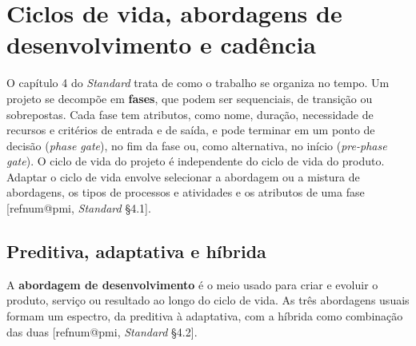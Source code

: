 \documentclass[11pt,a4paper]{article}
\makeatletter
\newcommand{\refnum}[1]{\csname refnum@#1\endcsname}
\makeatother
\begin{document}
\section{Ciclos de vida, abordagens de desenvolvimento e cadência}

O capítulo 4 do \textit{Standard} trata de como o trabalho se organiza no tempo. Um projeto se decompõe em \textbf{fases}, que podem ser sequenciais, de transição ou sobrepostas. Cada fase tem atributos, como nome, duração, necessidade de recursos e critérios de entrada e de saída, e pode terminar em um ponto de decisão (\textit{phase gate}), no fim da fase ou, como alternativa, no início (\textit{pre-phase gate}). O ciclo de vida do projeto é independente do ciclo de vida do produto. Adaptar o ciclo de vida envolve selecionar a abordagem ou a mistura de abordagens, os tipos de processos e atividades e os atributos de uma fase [\refnum{pmi}, \textit{Standard} §4.1].
\subsection{Preditiva, adaptativa e híbrida}

A \textbf{abordagem de desenvolvimento} é o meio usado para criar e evoluir o produto, serviço ou resultado ao longo do ciclo de vida. As três abordagens usuais formam um espectro, da preditiva à adaptativa, com a híbrida como combinação das duas [\refnum{pmi}, \textit{Standard} §4.2].
\end{document}

